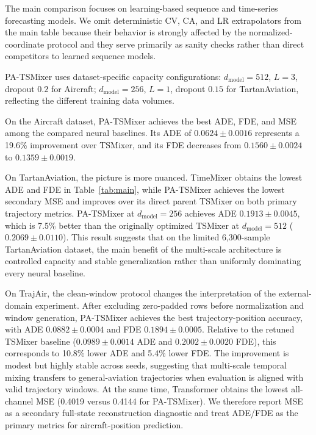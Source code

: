 \documentclass[letterpaper,journal]{IEEEtran}
\begin{document}
The main comparison focuses on learning-based sequence and time-series forecasting
models. We omit deterministic CV, CA, and LR extrapolators from the main table
because their behavior is strongly affected by the normalized-coordinate protocol
and they serve primarily as sanity checks rather than direct competitors to
learned sequence models.

PA-TSMixer uses dataset-specific capacity configurations: $d_{\text{model}}\!=\!512$,
$L\!=\!3$, dropout $0.2$ for Aircraft; $d_{\text{model}}\!=\!256$, $L\!=\!1$, dropout
$0.15$ for TartanAviation, reflecting the different training data volumes.

On the Aircraft dataset, PA-TSMixer achieves the best ADE, FDE, and MSE among
the compared neural baselines. Its ADE of $0.0624 \pm 0.0016$ represents a
19.6\% improvement over TSMixer, and its FDE decreases from
$0.1560 \pm 0.0024$ to $0.1359 \pm 0.0019$.

On TartanAviation, the picture is more nuanced. TimeMixer obtains the lowest
ADE and FDE in Table~\ref{tab:main}, while PA-TSMixer achieves the lowest
secondary MSE and improves over its direct parent TSMixer on both primary
trajectory metrics. PA-TSMixer at $d_{\text{model}}\!=\!256$ achieves
ADE $0.1913 \pm 0.0045$, which is 7.5\% better than the originally optimized
TSMixer at $d_{\text{model}}\!=\!512$ ($0.2069 \pm 0.0110$). This result
suggests that on the limited 6,300-sample TartanAviation dataset, the main
benefit of the multi-scale architecture is controlled capacity and stable
generalization rather than uniformly dominating every neural baseline.

On TrajAir, the clean-window protocol changes the interpretation of the
external-domain experiment. After excluding zero-padded rows before normalization
and window generation, PA-TSMixer achieves the best trajectory-position accuracy,
with ADE $0.0882 \pm 0.0004$ and FDE $0.1894 \pm 0.0005$. Relative to the
retuned TSMixer baseline ($0.0989 \pm 0.0014$ ADE and $0.2002 \pm 0.0020$
FDE), this corresponds to 10.8\% lower ADE and 5.4\% lower FDE. The improvement
is modest but highly stable across seeds, suggesting that multi-scale temporal
mixing transfers to general-aviation trajectories when evaluation is aligned
with valid trajectory windows. At the same time, Transformer obtains the lowest
all-channel MSE (0.4019 versus 0.4144 for PA-TSMixer). We therefore report MSE
as a secondary full-state reconstruction diagnostic and treat ADE/FDE as the
primary metrics for aircraft-position prediction.
\end{document}
